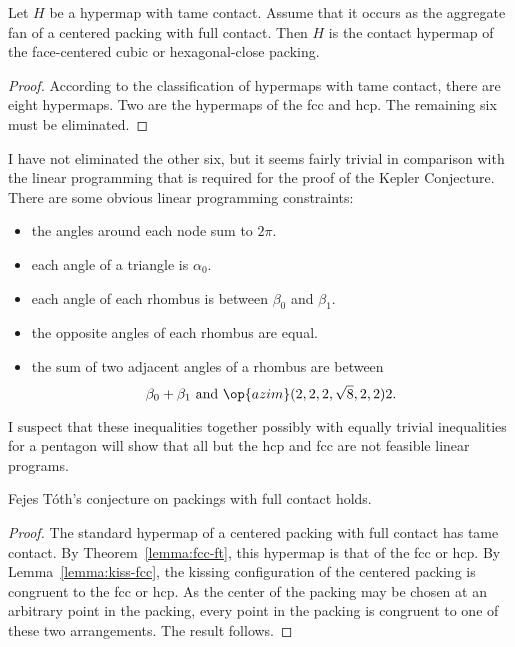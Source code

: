 \begin{lemma}\label{lemma:fcc-ft} Let $H$ be a hypermap
  with tame contact.  Assume that it occurs as the aggregate fan of a
  centered packing with full contact.  Then $H$ is the contact
  hypermap of the face-centered cubic or hexagonal-close packing.
\end{lemma}

\begin{proof} According to the classification of hypermaps with tame
  contact, there are eight hypermaps.  Two are the hypermaps of the
  fcc and hcp.  The remaining six must be eliminated.
\end{proof}

\begin{note}%
  I have not eliminated the other six, but it seems fairly trivial in
  comparison with the linear programming that is required for the
  proof of the Kepler Conjecture.  There are some obvious linear
  programming constraints:
\begin{itemize}
\item the angles around each node sum to $2\pi$.
\item each angle of a triangle is $\alpha_0$.
\item each angle of each rhombus is between $\beta_0$ and $\beta_1$.
\item the opposite angles of each rhombus are equal.
\item the sum of two adjacent angles of a rhombus are between
\begin{displaymath}
\beta_0 + \beta_1 \hbox{ and } \op{azim}(2,2,2,\sqrt8,2,2)2.
\end{displaymath}
\end{itemize}
I suspect that these inequalities together possibly with equally
trivial inequalities for a pentagon will show that all but the hcp and
fcc are not feasible linear programs.
\end{note}

\begin{theorem}  
Fejes T\'oth's conjecture on packings with full contact holds.
\end{theorem}
%

\begin{proof} The standard hypermap of a centered packing with full
  contact has tame contact.  By Theorem~\ref{lemma:fcc-ft}, this
  hypermap is that of the fcc or hcp.  By Lemma~\ref{lemma:kiss-fcc},
  the kissing configuration of the centered packing is congruent to
  the fcc or hcp.  As the center of the packing may be chosen at an
  arbitrary point in the packing, every point in the packing is
  congruent to one of these two arrangements.  The result follows.
\end{proof}
%
%

